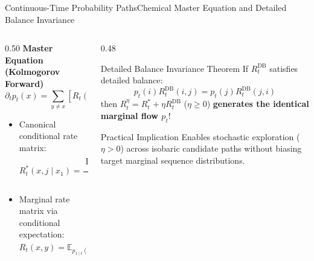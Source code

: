\documentclass[aspectratio=169, 10pt]{beamer}
\begin{document}
\begin{frame}{Continuous-Time Probability Paths}{Chemical Master Equation and Detailed Balance Invariance}
\begin{columns}[T]
\begin{column}{0.50\textwidth}
  \textbf{\footnotesize Master Equation (Kolmogorov Forward)}
  \begin{equation*}
    \partial_t p_t(x) = \sum_{y \ne x} \left[ R_t(y, x) \, p_t(y) - R_t(x, y) \, p_t(x) \right]
  \end{equation*}
  \begin{itemize}\setlength{\itemsep}{2pt}\scriptsize
    \item Canonical conditional rate matrix:
    \begin{equation*}
      R_t^*(x, j \mid x_1) = \frac{\operatorname{ReLU}(\partial_t p_{t \mid 1}(j \mid x_1))}{p_{t \mid 1}(x \mid x_1)} \quad (x \ne j)
    \end{equation*}
    \item Marginal rate matrix via conditional expectation:
    \begin{equation*}
      R_t(x, y) = \mathbb{E}_{p_{1 \mid t}(x_1 \mid x)} \left[ R_t^*(x, y \mid x_1) \right]
    \end{equation*}
  \end{itemize}
\end{column}

\begin{column}{0.48\textwidth}
  \begin{block}{\scriptsize Detailed Balance Invariance Theorem}
    \scriptsize
    If $R_t^{\text{DB}}$ satisfies detailed balance:
    \begin{equation*}
      p_t(i) R_t^{\text{DB}}(i, j) = p_t(j) R_t^{\text{DB}}(j, i)
    \end{equation*}
    then $R_t^\eta = R_t^* + \eta R_t^{\text{DB}}$ ($\eta \ge 0$) \textbf{generates the identical marginal flow $p_t$}!
  \end{block}
  \vspace{0.1cm}
  \begin{alertblock}{\scriptsize Practical Implication}
    \tiny
    Enables stochastic exploration ($\eta > 0$) across isobaric candidate paths without biasing target marginal sequence distributions.
  \end{alertblock}
\end{column}
\end{columns}
\end{frame}
\end{document}

